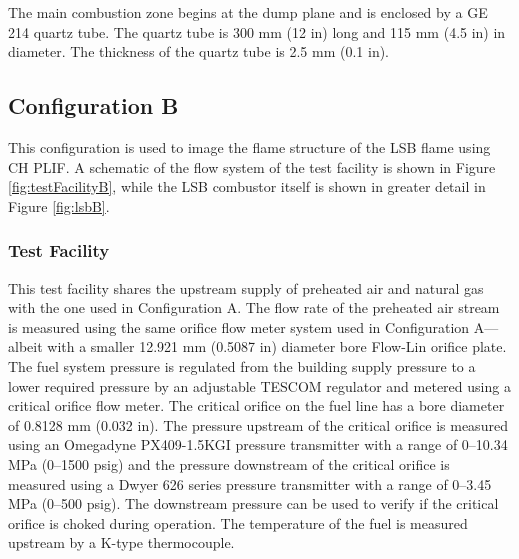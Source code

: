The main combustion zone begins at the dump plane and is enclosed by a GE 214 quartz tube.
The quartz tube is 300 mm (12 in) long and 115 mm (4.5 in) in diameter.
The thickness of the quartz tube is 2.5 mm (0.1 in).

\subsection{Configuration B}
\label{subsec:lsb-configuration-b}

This configuration is used to image the flame structure of the LSB flame using CH PLIF.
A schematic of the flow system of the test facility is shown in Figure \ref{fig:testFacilityB}, while the LSB combustor itself is shown in greater detail in Figure \ref{fig:lsbB}.

\subsubsection{Test Facility}
\label{subsubsec:configuration-b-test-facility}



This test facility shares the upstream supply of preheated air and natural gas with the one used in Configuration A.
The flow rate of the preheated air stream is measured using the same orifice flow meter system used in Configuration A---albeit with a smaller 12.921 mm (0.5087 in) diameter bore Flow-Lin orifice plate.
The fuel system pressure is regulated from the building supply pressure to a lower required pressure by an adjustable TESCOM regulator and metered using a critical orifice flow meter.
The critical orifice on the fuel line has a bore diameter of 0.8128 mm (0.032 in).
The pressure upstream of the critical orifice is measured using an Omegadyne PX409-1.5KGI pressure transmitter with a range of 0--10.34 MPa (0--1500 psig) and the pressure downstream of the critical orifice is measured using a Dwyer 626 series pressure transmitter with a range of 0--3.45 MPa (0--500 psig).
The downstream pressure can be used to verify if the critical orifice is choked during operation.
The temperature of the fuel is measured upstream by a K-type thermocouple.

